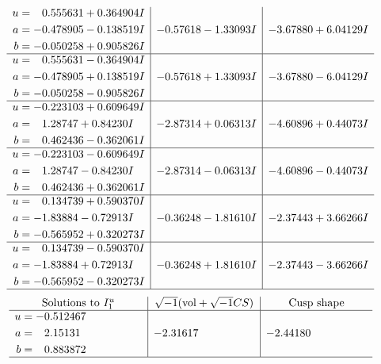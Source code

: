 \documentclass[1p]{elsarticle_modified}
\theoremstyle{definition}
\newcommand{\I}{\sqrt{-1}}
\begin{document}
$$\begin{array}{c|c|c}
\begin{aligned}
u &= \phantom{-}0.555631 + 0.364904 I \\
a &= -0.478905 - 0.138519 I \\
b &= -0.050258 + 0.905826 I\end{aligned}
 & -0.57618 - 1.33093 I & -3.67880 + 6.04129 I \\ \hline\begin{aligned}
u &= \phantom{-}0.555631 - 0.364904 I \\
a &= -0.478905 + 0.138519 I \\
b &= -0.050258 - 0.905826 I\end{aligned}
 & -0.57618 + 1.33093 I & -3.67880 - 6.04129 I \\ \hline\begin{aligned}
u &= -0.223103 + 0.609649 I \\
a &= \phantom{-}1.28747 + 0.84230 I \\
b &= \phantom{-}0.462436 - 0.362061 I\end{aligned}
 & -2.87314 + 0.06313 I & -4.60896 + 0.44073 I \\ \hline\begin{aligned}
u &= -0.223103 - 0.609649 I \\
a &= \phantom{-}1.28747 - 0.84230 I \\
b &= \phantom{-}0.462436 + 0.362061 I\end{aligned}
 & -2.87314 - 0.06313 I & -4.60896 - 0.44073 I \\ \hline\begin{aligned}
u &= \phantom{-}0.134739 + 0.590370 I \\
a &= -1.83884 - 0.72913 I \\
b &= -0.565952 + 0.320273 I\end{aligned}
 & -0.36248 - 1.81610 I & -2.37443 + 3.66266 I \\ \hline\begin{aligned}
u &= \phantom{-}0.134739 - 0.590370 I \\
a &= -1.83884 + 0.72913 I \\
b &= -0.565952 - 0.320273 I\end{aligned}
 & -0.36248 + 1.81610 I & -2.37443 - 3.66266 I\\
 \hline 
 \end{array}$$\newpage$$\begin{array}{c|c|c}  
\text{Solutions to }I^u_{1}& \I (\text{vol} + \sqrt{-1}CS) & \text{Cusp shape}\\
 \hline 
\begin{aligned}
u &= -0.512467\phantom{ +0.000000I} \\
a &= \phantom{-}2.15131\phantom{ +0.000000I} \\
b &= \phantom{-}0.883872\phantom{ +0.000000I}\end{aligned}
 & -2.31617\phantom{ +0.000000I} & -2.44180\phantom{ +0.000000I}\\
 \hline 
 \end{array}$$\newpage\newpage\renewcommand{\arraystretch}{1}
\end{document}
